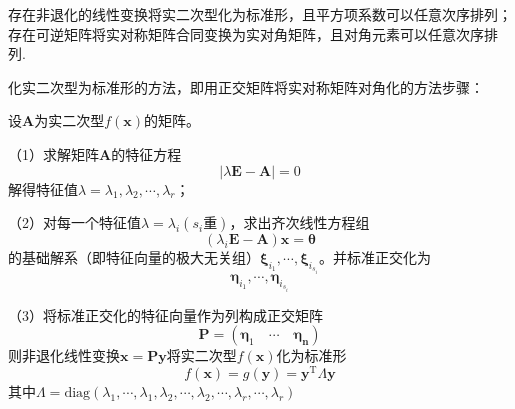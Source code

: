 \begin{theorem}
    存在非退化的线性变换将实二次型化为标准形，且平方项系数可以任意次序排列；存在可逆矩阵将实对称矩阵合同变换为实对角矩阵，且对角元素可以任意次序排列.
\end{theorem}

\begin{theorem}
    化实二次型为标准形的方法，即用正交矩阵将实对称矩阵对角化的方法步骤：

    设$\boldsymbol{A}$为实二次型$f(\boldsymbol{x})$的矩阵。

    （1）求解矩阵$\boldsymbol{A}$的特征方程$$|\lambda\boldsymbol{E}-\boldsymbol{A}|=0$$
    解得特征值$\lambda=\lambda_1,\lambda_2,\cdots,\lambda_r$；


    （2）对每一个特征值$\lambda=\lambda_i(s_i\mbox{重})$，求出齐次线性方程组
    $$(\lambda_i\boldsymbol{E}-\boldsymbol{A})\boldsymbol{x}=\boldsymbol{\theta}$$
    的基础解系（即特征向量的极大无关组）$\boldsymbol{\xi}_{i_1},\cdots,\boldsymbol{\xi}_{i_{s_i}}$。并标准正交化为
    $$\boldsymbol{\eta}_{i_1},\cdots,\boldsymbol{\eta}_{i_{s_i}}$$

    （3）将标准正交化的特征向量作为列构成正交矩阵
    $$\boldsymbol{P}=(\boldsymbol{\eta}_1\quad \cdots\quad \boldsymbol{\eta_n})$$
    则非退化线性变换$\boldsymbol{x}=\boldsymbol{P}\boldsymbol{y}$将实二次型$f(\boldsymbol{x})$化为标准形
    $$f(\boldsymbol{x})=g(\boldsymbol{y})=\boldsymbol{y}^\mathrm{T}\boldsymbol{\varLambda} \boldsymbol{y}$$
    其中$\boldsymbol{\varLambda} =\mathrm{diag}(\lambda_1,\cdots,\lambda_1,\lambda_2,\cdots,\lambda_2,\cdots,\lambda_r,\cdots,\lambda_r)$
\end{theorem}


